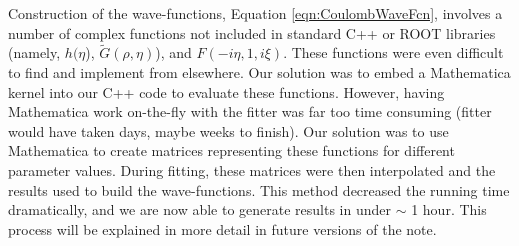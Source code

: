 \documentclass[/home/jesse/Analysis/FemtoAnalysis/AnalysisNotes/AnalysisNoteJBuxton.tex]{subfiles}
\begin{document}
Construction of the wave-functions, Equation \ref{eqn:CoulombWaveFcn}, involves a number of complex functions not included in standard C++ or ROOT libraries (namely, $h(\eta$), $\tilde{G}(\rho,\eta)$), and $F(-i\eta,1,i\xi)$.  These functions were even difficult to find and implement from elsewhere.  Our solution was to embed a Mathematica kernel into our C++ code to evaluate these functions.  However, having Mathematica work on-the-fly with the fitter was far too time consuming (fitter would have taken days, maybe weeks to finish).  Our solution was to use Mathematica to create matrices representing these functions for different parameter values.  During fitting, these matrices were then interpolated and the results used to build the wave-functions.  This method decreased the running time dramatically, and we are now able to generate results in under $\sim$ 1 hour. This process will be explained in more detail in future versions of the note.
\end{document}
